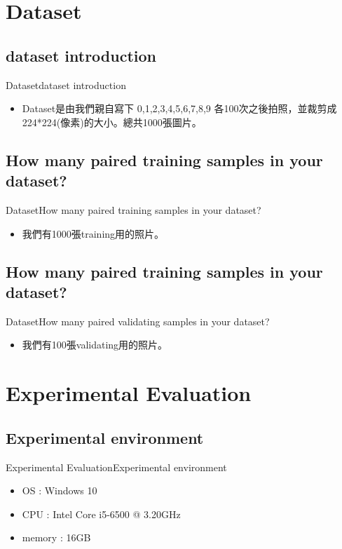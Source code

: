 \documentclass{beamer}
\begin{document}
\begin{CJK*}{UTF8}{bsmi}
\section{Dataset}
\subsection*{dataset introduction}
\begin{frame}{Dataset}{dataset introduction}
  \begin{itemize}
  \item {
   Dataset是由我們親自寫下 0,1,2,3,4,5,6,7,8,9 各100次之後拍照，並裁剪成 224*224(像素)的大小。總共1000張圖片。
  }
  \end{itemize}
\end{frame}
\subsection*{How many paired training samples in your dataset?}
\begin{frame}{Dataset}{How many paired training samples in your dataset?}
  \begin{itemize}
  \item {
   我們有1000張training用的照片。
  }
  \end{itemize}
\end{frame}
\subsection*{How many paired training samples in your dataset?}
\begin{frame}{Dataset}{How many paired validating samples in your dataset?}
  \begin{itemize}
  \item {
   我們有100張validating用的照片。
  }
  \end{itemize}
\end{frame}

\section{Experimental Evaluation}
\subsection*{Experimental environment}
\begin{frame}{Experimental Evaluation}{Experimental environment}
  \begin{itemize}
  \item {
   OS : Windows 10
  }
  \item {
   CPU : Intel Core i5-6500 @ 3.20GHz
  }
  \item {
   memory : 16GB
  }
  \end{itemize}
\end{frame}

\end{CJK*}
\end{document}
